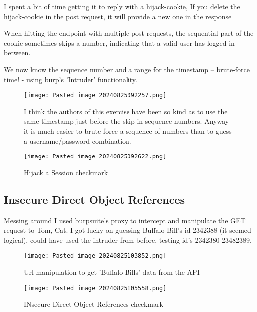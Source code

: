 \documentclass[
	letterpaper, %
	10pt, %
	unnumberedsections, %
	twoside, %
]{APAAssignment}
\begin{document}
\begin{appendices}
I spent a bit of time getting it to reply with a hijack-cookie, If you delete the hijack-cookie in the post request, it will provide a new one in the response

When hitting the endpoint with multiple post requests, the sequential part of the cookie sometimes skips a number, indicating that a valid user has logged in between.

We now know the sequence number and a range for the timestamp -- brute-force time! - using burp's 'Intruder' functionality. 


\begin{figure}[!ht]
	\centering
	\texttt{[image: Pasted image 20240825092257.png]}
	\caption{I think the authors of this exercise have been so kind as to use the same timestamp just before the skip in sequence numbers. 
	Anyway it is much easier to brute-force a sequence of numbers than to guess a username/password combination.
	}
	\label{fig:HijackCookieSolved}
\end{figure}

\begin{figure}[!ht] %
	\centering
	\texttt{[image: Pasted image 20240825092622.png]}
	\caption{Hijack a Session checkmark}
	\label{fig:HijackCookieSolvedCheck}
\end{figure}


\subsection{Insecure Direct Object References}
Messing around I used burpsuite's proxy to intercept and manipulate the GET request to Tom, Cat. I got lucky on guessing Buffalo Bill's id 2342388 (it seemed logical), could have used the intruder from before, testing id's 2342380-23482389.   

\begin{figure}[!htb] %
	\texttt{[image: Pasted image 20240825103852.png]}
	\caption{Url manipulation to get 'Buffalo Bills' data from the API}
	\label{fig:BuffaloBillGET}
\end{figure}


\begin{figure}[!htb] %
	\centering
	\texttt{[image: Pasted image 20240825105558.png]}
	\caption{INsecure Direct Object References checkmark}
	\label{fig:InsecureObjectSolvedCheck}
\end{figure}



\end{appendices}
\end{document}

